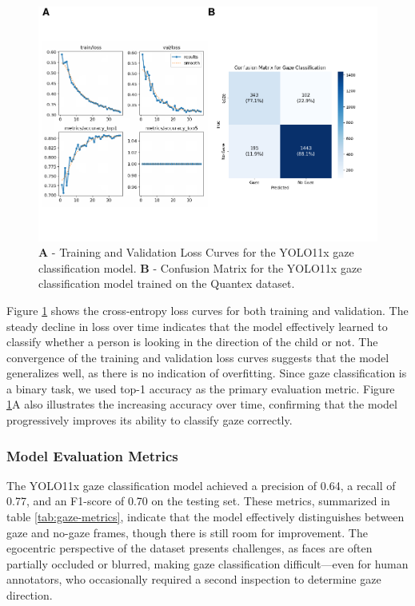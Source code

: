 \documentclass[
  man,floatsintext]{apa6}
\begin{document}
\begin{figure}

{\centering \includegraphics{Quantex_interaction_paper_files/figure-latex/gaze-loss-confusion-matrix-1} 

}

\caption{\textbf{A} - Training and Validation Loss Curves for the YOLO11x gaze classification model. \textbf{B} - Confusion Matrix for the YOLO11x gaze classification model trained on the Quantex dataset.}\label{fig:gaze-loss-confusion-matrix}
\end{figure}

Figure \ref{fig:gaze-loss-confusion-matrix} shows the cross-entropy loss curves for both training and validation. The steady decline in loss over time indicates that the model effectively learned to classify whether a person is looking in the direction of the child or not. The convergence of the training and validation loss curves suggests that the model generalizes well, as there is no indication of overfitting. Since gaze classification is a binary task, we used top-1 accuracy as the primary evaluation metric. Figure \ref{fig:gaze-loss-confusion-matrix}A also illustrates the increasing accuracy over time, confirming that the model progressively improves its ability to classify gaze correctly.

\subsubsection{Model Evaluation Metrics}\label{model-evaluation-metrics-1}

The YOLO11x gaze classification model achieved a precision of 0.64, a recall of 0.77, and an F1-score of 0.70 on the testing set. These metrics, summarized in table \ref{tab:gaze-metrics}, indicate that the model effectively distinguishes between gaze and no-gaze frames, though there is still room for improvement. The egocentric perspective of the dataset presents challenges, as faces are often partially occluded or blurred, making gaze classification difficult---even for human annotators, who occasionally required a second inspection to determine gaze direction.
\end{document}
